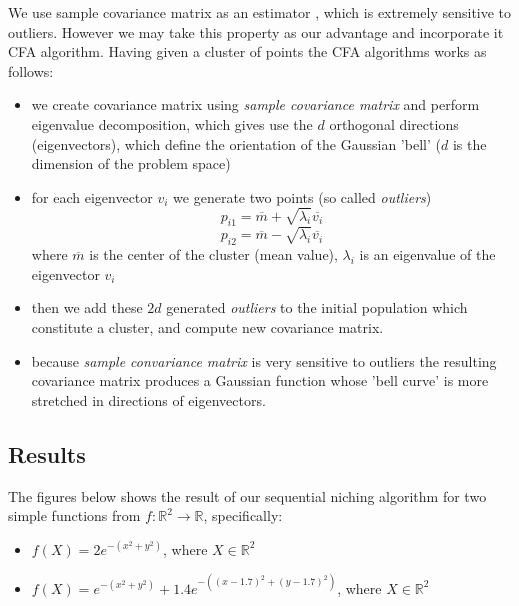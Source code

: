 We use sample covariance matrix as an estimator \cite{covariance}, which is 
extremely sensitive to outliers. However we may take this property as our
advantage and incorporate it CFA algorithm. 
Having given a cluster of points the CFA algorithms works as follows:

\begin{itemize}
  \item we create covariance matrix using \textit{sample covariance matrix}
  \cite{covariance} and perform eigenvalue decomposition, which gives use the
  $d$ orthogonal directions (eigenvectors), which define the orientation of the 
  Gaussian 'bell' ($d$ is the dimension of the problem space)
  \item for each eigenvector $v_i$ we generate two points (so called
  \textit{outliers})
  \begin{equation}
  	p_{i1} = \overline{m} + \sqrt{\lambda_i}\overline{v_i}
  \end{equation} 
  \begin{equation}
  	p_{i2} = \overline{m} - \sqrt{\lambda_i}\overline{v_i}
  \end{equation} 
  where $\overline{m}$ is the center of the cluster (mean value), $\lambda_i$ is
  an eigenvalue of the eigenvector $v_i$
  \item then we add these $2d$ generated \textit{outliers} to the initial
  population which constitute a cluster, and compute new covariance matrix.
  \item because \textit{sample convariance matrix} is very sensitive to outliers
  the resulting covariance matrix produces a Gaussian function whose 'bell
  curve' is more stretched in directions of eigenvectors.
  \end{itemize}

\subsection{Results}

The figures below shows the result of our sequential niching algorithm for two
simple functions from $f:\mathbb{R}^2 \rightarrow \mathbb{R}$, specifically:
\begin{itemize}
  \item $f(X) = 2e^{-(x^2 + y^2)}$, where $X \in \mathbb{R}^2$
  \item $f(X) = e^{-(x^2 + y^2)}+1.4e^{-((x-1.7)^2 + (y-1.7)^2)}$, where $X \in
  \mathbb{R}^2$
\end{itemize}


